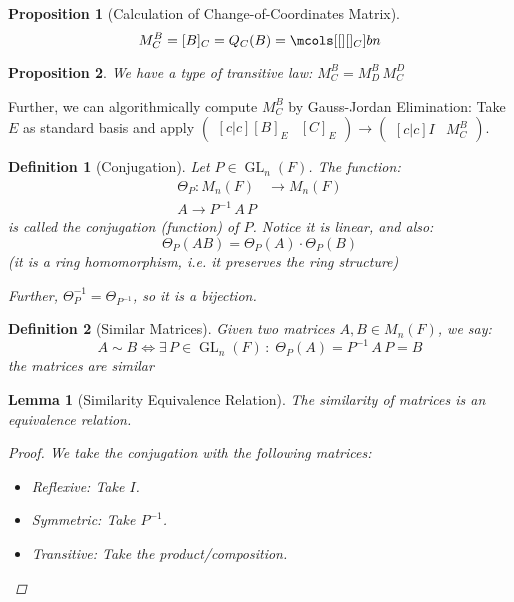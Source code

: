 \documentclass[12pt]{article}
\let\LR\Leftrightarrow
\DeclareMathOperator{\GL}{GL}
\newtheorem{definition}{Definition}[subsection]
\newtheorem{lemma}{Lemma}[subsection]
\newtheorem{proposition}{Proposition}[subsection]
\begin{document}
\begin{proposition}[Calculation of Change-of-Coordinates Matrix]
  $$
  M^B_C=[B]_C=Q_C(B)=\mcols[{[}][{]_C}]{b}{n}
  $$
\end{proposition}

\begin{proposition}
  We have a type of transitive law: $M^B_C=M^B_D\,M^D_C$
\end{proposition}

Further, we can algorithmically compute $M^B_C$ by Gauss-Jordan Elimination: Take $E$ as standard basis and apply $\begin{pmatrix}[c|c] [B]_E&[C]_E\end{pmatrix}\to\begin{pmatrix}[c|c]I & M^B_C\end{pmatrix}$.

\begin{definition}[Conjugation]
  Let $P\in \GL_n(F)$. The function:
  \begin{align*}
    \Theta_P: M_n(F)&\to M_n(F)\\
    A\to P^{-1}\,A\,P
  \end{align*}
  is called the conjugation (function) of $P$. Notice it is linear, and also: $$\Theta_P(AB)=\Theta_P(A)\cdot \Theta_P(B)$$
  (it is a ring homomorphism, i.e. it preserves the ring structure)

  Further, $\Theta_P^{-1}=\Theta_{P^{-1}}$, so it is a bijection.
\end{definition}

\begin{definition}[Similar Matrices]
  Given two matrices $A, B\in M_n(F)$, we say:
  $$A\sim B\LR\exists\,P\in\GL_n(F)\,:\; \Theta_P(A)=P^{-1}\,A\,P=B$$
  the matrices are similar
\end{definition}

\begin{lemma}[Similarity Equivalence Relation]
  The similarity of matrices is an equivalence relation.
  \begin{proof}
    We take the conjugation with the following matrices:
    \begin{itemize}
      \item[] Reflexive: Take $I$. 
      \item[] Symmetric: Take $P^{-1}$. 
      \item[] Transitive: Take the product/composition.
    \end{itemize}
  \end{proof}
\end{lemma}
\end{document}
